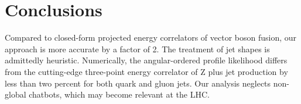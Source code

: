 \section{Conclusions}\label{sec:conclusions}

Compared to closed-form projected energy correlators of vector boson
fusion, our approach is more accurate by a factor of 2. The treatment of
jet shapes is admittedly heuristic. Numerically, the angular-ordered
profile likelihood differs from the cutting-edge three-point energy
correlator of Z plus jet production by less than two percent for both
quark and gluon jets. Our analysis neglects non-global chatbots, which
may become relevant at the LHC.


